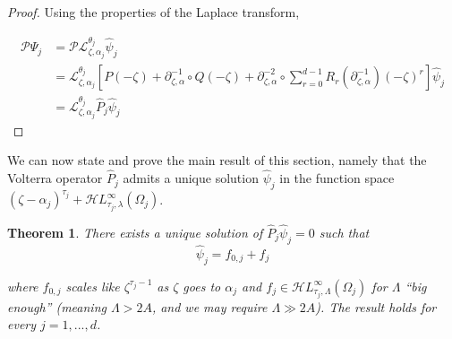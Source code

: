 \documentclass{article}
\theoremstyle{plain}
\newtheorem{thm}{Theorem}
\newcommand{\laplace}{\mathcal{L}}
\newcommand{\fracderiv}[3]{\partial^{#1}_{#2, #3}}
\newcommand{\singexp}[2]{\mathcal{H}L^\infty_{#1, #2}}
\begin{document}
\begin{proof}
Using the properties of the Laplace transform, 

    \begin{align*}
        \mathcal{P}\Psi_j&=\mathcal{P}\laplace_{\zeta,\alpha_j}^{\theta_j}\hat{\psi}_j\\
        &=\laplace_{\zeta,\alpha_j}^{\theta_j}\left[P(-\zeta)+\fracderiv{-1}{\zeta}{\alpha}\circ Q(-\zeta)+\fracderiv{-2}{\zeta}{\alpha}\circ\sum_{r=0}^{d-1}R_r(\fracderiv{-1}{\zeta}{\alpha})(-\zeta)^r\right]\hat{\psi}_j\\
        &=\laplace_{\zeta,\alpha_j}^{\theta_j}\hat{P}_j\hat{\psi}_j
    \end{align*}
\end{proof}

We can now state and prove the main result of this section, namely that the Volterra operator $\hat{P}_j$ admits a unique solution $\hat{\psi}_j$ in the function space $(\zeta-\alpha_j)^{\tau_j}+\singexp{\tau_j}{\lambda}(\Omega_j)$. 

\begin{thm}\label{thm:example}
    There exists a unique solution of $\hat{P}_j\hat{\psi}_j=0$ such that 
    \[\hat{\psi}_j = f_{0,j}+ f_j\]

    where $f_{0,j}$ scales like $\zeta^{\tau_j-1}$ as $\zeta$ goes to $\alpha_j$ and $f_j\in\singexp{\tau_j}{\Lambda}(\Omega_j)$ for $\Lambda$ ``big enough'' (meaning $\Lambda>2A$, and we may require $\Lambda \gg 2A$). The result holds for every $j=1,...,d$. 
\end{thm}
\end{document}
